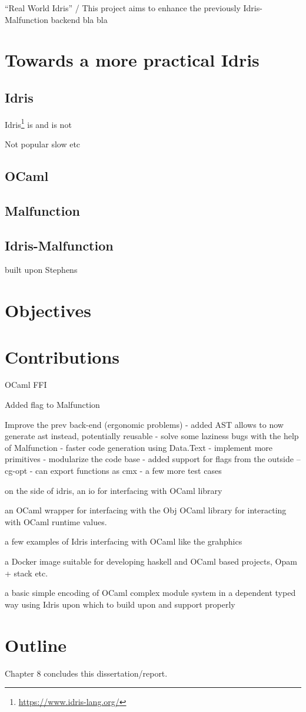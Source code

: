 ``Real World Idris'' / This project aims to enhance the previously 
Idris-Malfunction backend bla bla

\section{Towards a more practical Idris}
\subsection{Idris}
Idris\footnote{\url{https://www.idris-lang.org/}} is and is not

Not popular slow etc 

\subsection{OCaml}

\subsection{Malfunction}

\subsection{Idris-Malfunction}
built upon Stephens


\section{Objectives}

\section{Contributions}
OCaml FFI 

Added flag to Malfunction

Improve the prev back-end  (ergonomic problems)
	- added AST allows to now generate ast instead, potentially reusable
	- solve some laziness bugs with the help of Malfunction 
	- faster code generation using Data.Text
	- implement more primitives 
	- modularize the code base 
	- added support for flags from the outside --cg-opt
	- can export functions as cmx 
	- a few more test cases

on the side of idris, an io for interfacing with OCaml library

an OCaml wrapper for interfacing with the Obj OCaml library for
interacting with OCaml runtime values. 

a few examples of Idris interfacing with OCaml like the
grahphics

a Docker image suitable for developing haskell and OCaml
based projects, Opam + stack etc.

a basic simple encoding of OCaml complex module system in
a dependent typed way using Idris upon which to build
upon and support properly




\section{Outline}


Chapter 8 concludes this dissertation/report.